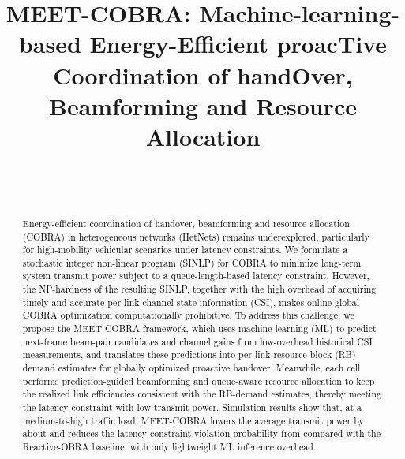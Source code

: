 \documentclass[conference, a4paper]{IEEEtran}
\newcommand{\currentrev}[1]{\textcolor{red}{{}#1}}
\newif\ifshowdeletions
\newcommand{\currentdel}[1]{\ifshowdeletions\textcolor{deletioncolor}{\sout{#1}}\fi}
\theoremstyle{remark}
\begin{document}
\title{MEET-COBRA: Machine-learning-based Energy-Efficient proacTive Coordination of handOver, Beamforming and Resource Allocation}


\author{\\
 \\
}

\maketitle

\begin{abstract}
\textcolor{black}{
Energy-efficient coordination of handover, beamforming and resource allocation (COBRA) in heterogeneous networks (HetNets) remains underexplored, particularly for high-mobility vehicular scenarios under latency constraints.
We formulate a stochastic integer non-linear program (SINLP) for COBRA to minimize long-term system transmit power subject to a queue-length-based latency constraint.
However, the NP-hardness of the resulting SINLP, together with the high overhead of acquiring timely and accurate per-link channel state information (CSI), makes online global COBRA optimization computationally prohibitive.
To address this challenge, we propose the MEET-COBRA framework, which uses machine learning (ML) to predict next-frame beam-pair candidates and channel gains from low-overhead historical CSI measurements, and translates these predictions into per-link resource block (RB) demand estimates for globally optimized proactive handover. 
Meanwhile, each cell performs prediction-guided beamforming and queue-aware resource allocation to keep the realized link efficiencies consistent with the RB-demand estimates, thereby meeting the latency constraint with low transmit power.
Simulation results show that, at a medium-to-high traffic load, MEET-COBRA lowers the average transmit power by about \currentdel{32\%} and reduces the latency constraint violation probability from \currentdel{29.47\% to 0.68\%} compared with the Reactive-OBRA baseline, with only lightweight ML inference overhead.
}
\end{abstract}
\end{document}
